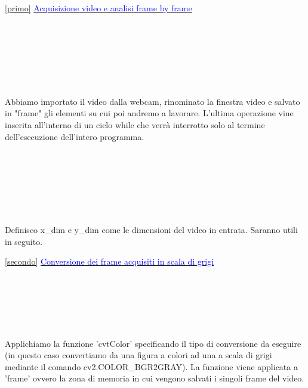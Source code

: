 \documentclass[12pt]{article}
\begin{document}
{\ref {primo} \underline{\textcolor{blue}{Acquisizione video e analisi frame by frame}}
    \\
    \\
    \\
    \\
	\\
	\\
	\\
	\\
	Abbiamo importato il video dalla webcam, rinominato la finestra video e salvato in "frame" gli elementi su cui poi andremo a lavorare. L'ultima operazione vine inserita all'interno di un ciclo while che verrà interrotto solo al termine dell'esecuzione dell'intero programma.
	\\
	\\
	\\
	\\
	\\
	\\
	\\
	\\
	Definisco x\_dim e y\_dim come le dimensioni del video in entrata. Saranno utili in seguito.
\pagebreak
  
  
\ref {secondo} \underline{\textcolor{blue}{Conversione dei frame acquisiti in scala di grigi}}
   \\
   \\
   \\
  
  	\\
  	\\
  	\\
  	\\
  	Applichiamo la funzione 'cvtColor' specificando il tipo di conversione da eseguire (in questo caso convertiamo da una figura a colori ad una a scala di grigi mediante il comando cv2.COLOR\_BGR2GRAY). La funzione viene applicata a 'frame' ovvero la zona di memoria in cui vengono salvati i singoli frame del video.
\pagebreak
  	
}
\end{document}
